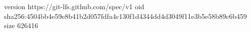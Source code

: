 version https://git-lfs.github.com/spec/v1
oid sha256:4504bb4e59e8b41b2d057fdfa4c130f1d4344dd4d3049f11e3b5e58b89c6b459
size 626416
